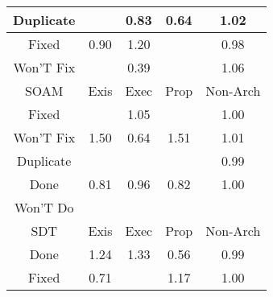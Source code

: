 \begin{tabular}{|c||c|c|c|c|}
\hline
Duplicate &  & \cellcolor[rgb]{0.8783699326987586,0.6902843481074571,0.39047860385217464} 0.83 & \cellcolor[rgb]{0.842375170343727,0.5199091396269744,0.35688349232081185} 0.64 & \cellcolor[rgb]{0.905838346329102,0.8380286903664167,0.42} 1.02 \\ 
\hline
Fixed & \cellcolor[rgb]{0.8911372131936005,0.7507161424497094,0.4023947323140272} 0.90 & \cellcolor[rgb]{0.865190262854947,0.8187743350365538,0.42} 1.20 &  & \cellcolor[rgb]{0.9064101207039359,0.8230079046652963,0.4166494459903401} 0.98 \\ 
\hline
Won'T Fix &  & \cellcolor[rgb]{0.7959408034059773,0.30011980278829253,0.31354474984557884} 0.39 &  & \cellcolor[rgb]{0.896119625436501,0.8334250857330794,0.42} 1.06 \\ 
\hline
\hline
SOAM & Exis & Exec & Prop & Non-Arch \\ 
\hline
Fixed &  & \cellcolor[rgb]{0.8996657244817833,0.835104816859792,0.42} 1.05 &  & \cellcolor[rgb]{0.9094914884285048,0.8375930452282561,0.41952538919993776} 1.00 \\ 
\hline
Won'T Fix & \cellcolor[rgb]{0.7961147509210829,0.7860543556994602,0.42} 1.50 & \cellcolor[rgb]{0.8426492297976449,0.5212063543755194,0.35713928114446863} 0.64 & \cellcolor[rgb]{0.7941585821662869,0.7851277494471885,0.42} 1.51 & \cellcolor[rgb]{0.9071449294337232,0.8386475981528162,0.42} 1.01 \\ 
\hline
Duplicate &  &  &  & \cellcolor[rgb]{0.9080204456661088,0.8306301094862486,0.4181524159550349} 0.99 \\ 
\hline
Done & \cellcolor[rgb]{0.874111669870272,0.6701285707192879,0.38650422521225397} 0.81 & \cellcolor[rgb]{0.9020253263085751,0.802253211193922,0.4125569712213367} 0.96 & \cellcolor[rgb]{0.8765427808123003,0.6816358291782213,0.3887732620914803} 0.82 & \cellcolor[rgb]{0.9090430380066804,0.8395467022136907,0.42} 1.00 \\ 
\hline
Won'T Do &  &  &  &  \\ 
\hline
\hline
SDT & Exis & Exec & Prop & Non-Arch \\ 
\hline
Done & \cellcolor[rgb]{0.8549948595216843,0.8139449334576399,0.41999999999999993} 1.24 & \cellcolor[rgb]{0.8343989910252446,0.8041889957488,0.41999999999999993} 1.33 & \cellcolor[rgb]{0.8269554168136599,0.44692230625132356,0.34249172235941594} 0.56 & \cellcolor[rgb]{0.9077319948719617,0.8292647757272852,0.4178831952138309} 0.99 \\ 
\hline
Fixed & \cellcolor[rgb]{0.8548978757526632,0.5791832785626054,0.3685713507024856} 0.71 &  & \cellcolor[rgb]{0.8709002843116674,0.8214790820423687,0.42} 1.17 & \cellcolor[rgb]{0.9096429503558,0.8398308712211684,0.42} 1.00 \\ 

\end{tabular}
